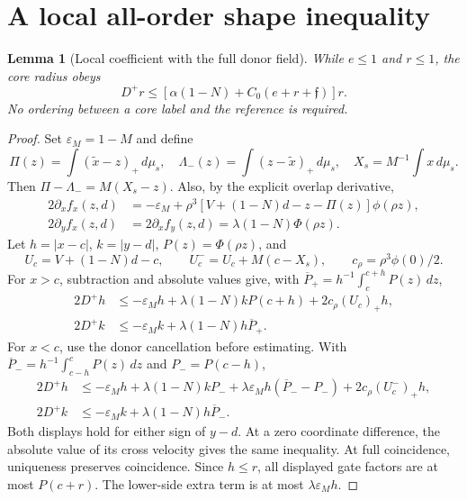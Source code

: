 \documentclass[11pt]{article}
\numberwithin{equation}{section}
\newtheorem{lemma}[theorem]{Lemma}
\theoremstyle{remark}\newtheorem{remark}[theorem]{Remark}
\newcommand{\dd}{\,d}\newcommand{\E}{\mathbb E}
\begin{document}
\section{A local all-order shape inequality}\label{inc:AN03:local:v1:shape}
\begin{lemma}[Local coefficient with the full donor field]
\label{inc:AN03:local:v1:localineq}
While $e\le1$ and $r\le1$, the core radius obeys
\begin{equation}\label{inc:AN03:local:v1:rineq}
 D^+r\le[\alpha(1-N)+C_0(e+r+\mathfrak f)]r.
\end{equation}
No ordering between a core label and the reference is required.
\end{lemma}
\begin{proof}
Set $\varepsilon_M=1-M$ and define
\[
 \Pi(z)=\int(\widetilde x-z)_+\dd\mu_s,\quad
 \Lambda_-(z)=\int(z-\widetilde x)_+\dd\mu_s,\quad
 X_s=M^{-1}\int x\dd\mu_s.
\]
Then $\Pi-\Lambda_-=M(X_s-z)$. Also, by the explicit overlap derivative,
\begin{align*}
 2\partial_xf_x(z,d)
  &=-\varepsilon_M+\rho^3[V+(1-N)d-z-\Pi(z)]\phi(\rho z),\\
 2\partial_yf_x(z,d)&=2\partial_xf_y(z,d)
          =\lambda(1-N)\Phi(\rho z).
\end{align*}
Let $h=|x-c|$, $k=|y-d|$, $P(z)=\Phi(\rho z)$, and
\[
 U_c=V+(1-N)d-c,\qquad U_c^-=U_c+M(c-X_s),\qquad
 c_\rho=\rho^3\phi(0)/2.
\]
For $x>c$, subtraction and absolute values give, with
$\overline P_+=h^{-1}\int_c^{c+h}P(z)\dd z$,
\begin{align*}
 2D^+h&\le-\varepsilon_Mh+\lambda(1-N)kP(c+h)
                    +2c_\rho(U_c)_+h,\\
 2D^+k&\le-\varepsilon_Mk+\lambda(1-N)h\overline P_+.
\end{align*}
For $x<c$, use the donor cancellation before estimating. With
$\overline P_-=h^{-1}\int_{c-h}^cP(z)\dd z$ and $P_-=P(c-h)$,
\begin{align*}
 2D^+h&\le-\varepsilon_Mh+\lambda(1-N)kP_-
  +\lambda\varepsilon_Mh(\overline P_--P_-)
  +2c_\rho(U_c^-)_+h,\\
 2D^+k&\le-\varepsilon_Mk+\lambda(1-N)h\overline P_-.
\end{align*}
Both displays hold for either sign of $y-d$. At a zero coordinate
difference, the absolute value of its cross velocity gives the same
inequality. At full coincidence, uniqueness preserves coincidence.
Since $h\le r$, all displayed gate factors are at most $P(c+r)$.
The lower-side extra term is at most $\lambda\varepsilon_Mh$.

\end{proof}
\end{document}
